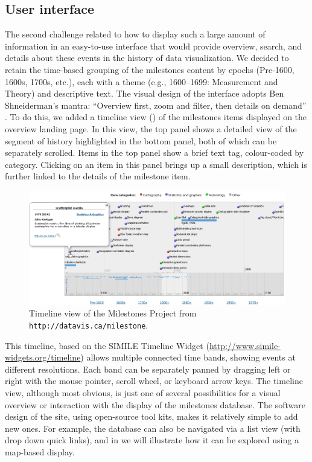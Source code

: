 \subsection{User interface}
The second challenge related to how to display such a large amount of 
information in an easy-to-use interface that would provide overview, search, 
and details about these events in the history of data visualization. 
We decided 
to retain the time-based grouping of the milestones content by epochs 
(Pre-1600, 1600s, 1700s, etc.), each with a theme (e.g., 1600--1699: 
Measurement and Theory) and descriptive text. 
The visual design of the 
interface adopts Ben Shneiderman's mantra: ``Overview first, zoom and filter, 
then details on demand'' \citep{Shneiderman:1996:IEEE}. 
To do this, we added a 
timeline view () of the milestones items 
displayed on the overview landing page.  In this view, the top panel shows a detailed view of the segment of history highlighted in the bottom panel, both of which can be separately scrolled. Items in the top panel show a brief text tag, colour-coded by category. Clicking on an item in this panel brings up a small description, which is further linked to the details of the milestone item.

\begin{figure}[!htb]
  \centering
  \includegraphics[width=\textwidth,clip]{fig/datavis-timeline2}
  \caption{Timeline view of the Milestones Project from 
  \texttt{http://datavis.ca/milestone}. }  
  \label{fig:datavis-timeline2}
\end{figure}

This timeline, based on the SIMILE Timeline Widget 
(\url{http://www.simile-widgets.org/timeline}) allows multiple connected time 
bands, showing events at different resolutions.  
Each band can be separately 
panned by dragging left or right with the mouse pointer, scroll wheel, or 
keyboard arrow keys. 
The timeline view, although most obvious, is just one of 
several possibilities for a visual overview or interaction with the display of 
the milestones database. 
The software design of the site, using open-source 
tool kits, makes it relatively simple to add new ones.  
For example, the 
database can also be navigated via a list view (with drop down quick links), 
and in  we will illustrate how it can be explored using a 
map-based display.
